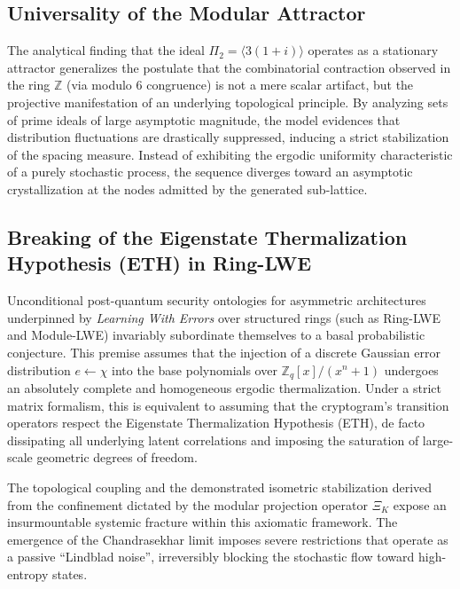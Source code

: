 \documentclass{article}
\numberwithin{equation}{section}
\theoremstyle{plain}
\theoremstyle{definition}
\begin{document}
\subsection{Universality of the Modular Attractor}

The analytical finding that the ideal $\Pi_2 = \langle 3(1+i) \rangle$ operates as a stationary attractor generalizes the postulate that the combinatorial contraction observed in the ring $\mathbb{Z}$ (via modulo $6$ congruence) is not a mere scalar artifact, but the projective manifestation of an underlying topological principle. By analyzing sets of prime ideals of large asymptotic magnitude, the model evidences that distribution fluctuations are drastically suppressed, inducing a strict stabilization of the spacing measure. Instead of exhibiting the ergodic uniformity characteristic of a purely stochastic process, the sequence diverges toward an asymptotic crystallization at the nodes admitted by the generated sub-lattice.

\subsection{Breaking of the Eigenstate Thermalization Hypothesis (ETH) in Ring-LWE}

Unconditional post-quantum security ontologies for asymmetric architectures underpinned by \textit{Learning With Errors} over structured rings (such as Ring-LWE and Module-LWE) invariably subordinate themselves to a basal probabilistic conjecture. This premise assumes that the injection of a discrete Gaussian error distribution $e \gets \chi$ into the base polynomials over $\mathbb{Z}_q[x]/(x^n+1)$ undergoes an absolutely complete and homogeneous ergodic thermalization. Under a strict matrix formalism, this is equivalent to assuming that the cryptogram's transition operators respect the Eigenstate Thermalization Hypothesis (ETH), de facto dissipating all underlying latent correlations and imposing the saturation of large-scale geometric degrees of freedom.

The topological coupling and the demonstrated isometric stabilization derived from the confinement dictated by the modular projection operator $\Xi_K$ expose an insurmountable systemic fracture within this axiomatic framework. The emergence of the Chandrasekhar limit imposes severe restrictions that operate as a passive ``Lindblad noise'', irreversibly blocking the stochastic flow toward high-entropy states.
\end{document}
